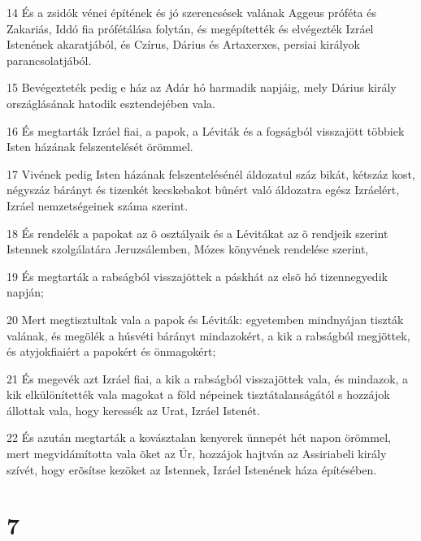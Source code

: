 {\par 14 És a zsidók vénei építének és jó szerencsések valának Aggeus próféta és Zakariás, Iddó fia prófétálása folytán, és megépítették és elvégezték Izráel Istenének akaratjából, és Czírus, Dárius és Artaxerxes, persiai királyok parancsolatjából.
\par 15 Bevégezteték pedig e ház az Adár hó harmadik napjáig, mely Dárius király országlásának hatodik esztendejében vala.
\par 16 És megtarták Izráel fiai, a papok, a Léviták és a fogságból visszajött többiek Isten házának felszentelését örömmel.
\par 17 Vivének pedig Isten házának felszentelésénél áldozatul száz bikát, kétszáz kost, négyszáz bárányt és tizenkét kecskebakot bûnért való áldozatra egész Izráelért, Izráel nemzetségeinek száma szerint.
\par 18 És rendelék a papokat az õ osztályaik és a Lévitákat az õ rendjeik szerint Istennek szolgálatára Jeruzsálemben, Mózes könyvének rendelése szerint,
\par 19 És megtarták a rabságból visszajöttek a páskhát az elsõ hó tizennegyedik napján;
\par 20 Mert megtisztultak vala a papok és Léviták: egyetemben mindnyájan tiszták valának, és megölék a húsvéti bárányt mindazokért, a kik a rabságból megjöttek, és atyjokfiaiért a papokért és önmagokért;
\par 21 És megevék azt Izráel fiai, a kik a rabságból visszajöttek vala, és mindazok, a kik elkülönítették vala magokat a föld népeinek tisztátalanságától s hozzájok állottak vala, hogy keressék az Urat, Izráel Istenét.
\par 22 És azután megtarták a kovásztalan kenyerek ünnepét hét napon örömmel, mert megvidámította vala õket az Úr, hozzájok hajtván az Assiriabeli király szívét, hogy erõsítse kezöket az Istennek, Izráel Istenének háza építésében.

\chapter{7}

}
